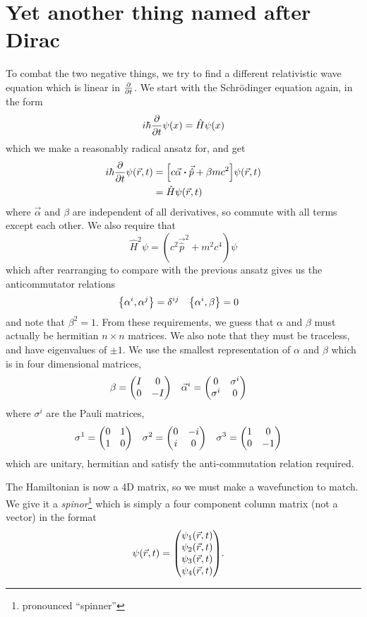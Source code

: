 \documentclass[]{revision-notes}
\begin{document}
\section{Yet another thing named after Dirac}
To combat the two negative things, we try to find a different relativistic wave equation which is linear in \( \pdv{t}\).
We start with the Schr\"odinger equation again, in the form
\[ i\hbar\pdv{t}\psi(x) = \hat{H}\psi(x) \]
which we make a reasonably radical ansatz for, and get
\begin{align*}
  i\hbar\pdv{t}\psi(\vec{r}, t) &= \qty[c \vec{\alpha}\vdot \vec{\hat{p}} + \beta m c^2]\psi(\vec{r}, t) \\
  &= \hat{H}\psi(\vec{r}, t)
\end{align*}
where \(\vec{\alpha}\) and \(\beta\) are independent of all derivatives, so commute with all terms except each other.
We also require that
\[ \hat{H}^2 \psi = (c^2\vec{\hat{p}}^2 + m^2 c^4)\psi\]
which after rearranging to compare with the previous ansatz gives us the anticommutator relations
\begin{align*}
  \anticommutator{\alpha^i}{\alpha^j} &= \delta^{ij} & \anticommutator{\alpha^i}{\beta} &= 0
\end{align*}
and note that \(\beta^2 = 1\).
From these requirements, we guess that \(\alpha\) and \(\beta\) must actually be hermitian \(n \times n\) matrices. We also note that they must be traceless, and have eigenvalues of \(\pm 1\).
We use the smallest representation of \(\alpha\) and \(\beta\) which is in four dimensional matrices,
\begin{align*}
  \beta &= \mqty(I&0\\0&-I) & \vec{\alpha}^i &= \mqty(0 & \sigma^i \\ \sigma^i & 0)
\end{align*}
where \(\sigma^i\) are the Pauli matrices,
\begin{align*}
  \sigma^1 &= \mqty(\pmat{1}) & \sigma^2 &= \mqty(\pmat{2}) & \sigma^3 &= \mqty(\pmat{3})
\end{align*}
 which are unitary, hermitian and satisfy the anti-commutation relation required.

 The Hamiltonian is now a 4D matrix, so we must make a wavefunction to match. We give it a \emph{spinor}\footnote{pronounced ``spinner''} which is simply a four component column matrix (not a vector) in the format
 \begin{align*}
   \psi(\vec{r}, t) &= \mqty(\psi_1(\vec{r},t)\\ \psi_2(\vec{r},t)\\ \psi_3(\vec{r},t)\\ \psi_4(\vec{r},t)).
 \end{align*}
\end{document}

